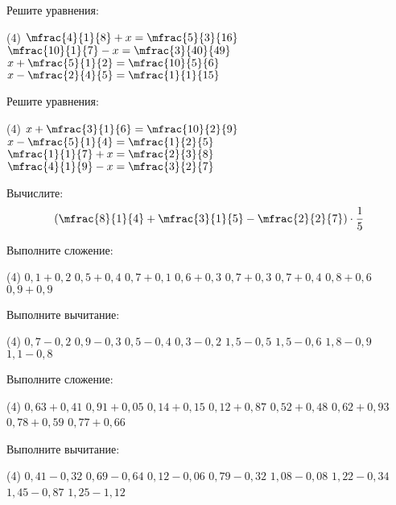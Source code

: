 %
%

\begin{class}[number=1]
	\begin{listofex}
		\item Решите уравнения:
		\begin{tasks}(4)
			\task \( \mfrac{4}{1}{8}+x=\mfrac{5}{3}{16} \)
			\task \( \mfrac{10}{1}{7}-x=\mfrac{3}{40}{49} \)
			\task \( x+\mfrac{5}{1}{2}=\mfrac{10}{5}{6} \)
			\task \( x-\mfrac{2}{4}{5}=\mfrac{1}{1}{15} \)
		\end{tasks}
		\item Решите уравнения:
		\begin{tasks}(4)
			\task \( x+\mfrac{3}{1}{6}=\mfrac{10}{2}{9} \)
			\task \( x-\mfrac{5}{1}{4}=\mfrac{1}{2}{5} \)
			\task \( \mfrac{1}{1}{7}+x=\mfrac{2}{3}{8} \)
			\task \( \mfrac{4}{1}{9}-x=\mfrac{3}{2}{7} \)
		\end{tasks}
		\item Вычислите: 
		\[ \left( \mfrac{8}{1}{4}+\mfrac{3}{1}{5}-\mfrac{2}{2}{7}  \right)\cdot\dfrac{1}{5}\]
	\end{listofex}
\end{class}

\begin{class}[number=2]
	\begin{listofex}
		\item Выполните сложение:
		\begin{tasks}(4)
			\task \( 0,1+0,2 \)
			\task \( 0,5+0,4 \)
			\task \( 0,7+0,1 \)
			\task \( 0,6+0,3 \)
			\task \( 0,7+0,3 \)
			\task \( 0,7+0,4 \)
			\task \( 0,8+0,6 \)
			\task \( 0,9+0,9 \)
		\end{tasks}
		\item Выполните вычитание:
		\begin{tasks}(4)
			\task \( 0,7-0,2 \)
			\task \( 0,9-0,3 \)
			\task \( 0,5-0,4 \)
			\task \( 0,3-0,2 \)
			\task \( 1,5-0,5 \)
			\task \( 1,5-0,6 \)
			\task \( 1,8-0,9 \)
			\task \( 1,1-0,8 \)
		\end{tasks}
		\item Выполните сложение:
		\begin{tasks}(4)
			\task \( 0,63+0,41 \)
			\task \( 0,91+0,05 \)
			\task \( 0,14+0,15 \)
			\task \( 0,12+0,87 \)
			\task \( 0,52+0,48 \)
			\task \( 0,62+0,93 \)
			\task \( 0,78+0,59 \)
			\task \( 0,77+0,66 \)
		\end{tasks}
		\item Выполните вычитание:
		\begin{tasks}(4)
			\task \( 0,41-0,32 \)
			\task \( 0,69-0,64 \)
			\task \( 0,12-0,06 \)
			\task \( 0,79-0,32 \)
			\task \( 1,08-0,08 \)
			\task \( 1,22-0,34 \)
			\task \( 1,45-0,87 \)
			\task \( 1,25-1,12 \)
		\end{tasks}
	\end{listofex}
\end{class}


